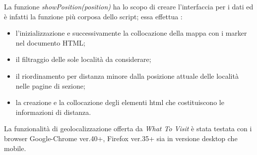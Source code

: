\begin{flushleft}
La funzione \textit{showPosition(position)} ha lo scopo di creare l'interfaccia per i dati ed è infatti la funzione più corposa dello script; essa effettua :
\end{flushleft}
\begin{itemize}
\item l'inizializzazione e successivamente la collocazione  della mappa con i marker nel documento HTML;
\item il filtraggio delle sole località da considerare;
\item il riordinamento per distanza minore dalla posizione attuale delle località nelle pagine di sezione;
\item la creazione e la collocazione degli elementi html che costituiscono le informazioni di distanza.
\end{itemize}

\begin{flushleft}
La funzionalità di geolocalizzazione offerta da \textit{What To Visit} è stata testata con i browser Google-Chrome ver.40+, Firefox ver.35+ sia in versione desktop che mobile.
\end{flushleft}



















